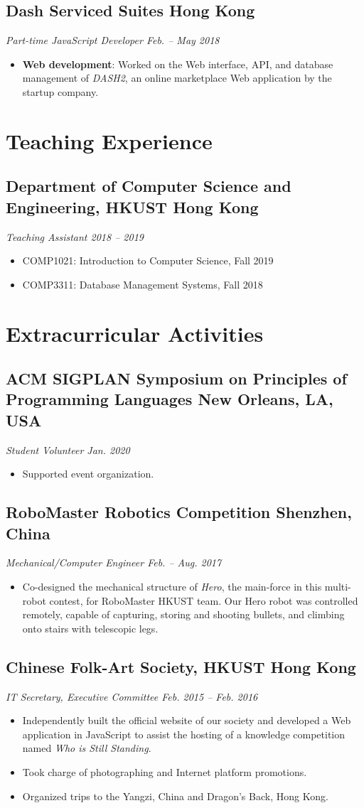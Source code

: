 \documentclass[10pt]{article}
\newcommand{\subsec}[2]{\subsection*{#1 \hfill {\normalfont #2}}}
\newcommand{\subsecdesc}[2]{{\em #1 \hfill #2}}
\begin{document}
  \subsec{Dash Serviced Suites}{Hong Kong}
  \subsecdesc{Part-time JavaScript Developer}{Feb. -- May 2018}
  \begin{itemize}
    \item \textbf{Web development}: Worked on the Web interface, API, and database management of \emph{DASH2}, an online marketplace Web application by the startup company.
  \end{itemize}

\section*{Teaching Experience} %

  \subsec{Department of Computer Science and Engineering, HKUST}{Hong Kong}
  \subsecdesc{Teaching Assistant}{2018 -- 2019}
  \begin{itemize}
    \item COMP1021: Introduction to Computer Science, Fall 2019
    \item COMP3311: Database Management Systems, Fall 2018
  \end{itemize}

\section*{Extracurricular Activities} %

  \subsec{ACM SIGPLAN Symposium on Principles of Programming Languages}{New Orleans, LA, USA}
  \subsecdesc{Student Volunteer}{Jan. 2020}
  \begin{itemize}
    \item Supported event organization.
  \end{itemize}

  \subsec{RoboMaster Robotics Competition}{Shenzhen, China}
  \subsecdesc{Mechanical/Computer Engineer}{Feb. -- Aug. 2017}
  \begin{itemize}
    \item Co-designed the mechanical structure of \emph{Hero}, the main-force in this multi-robot contest, for RoboMaster HKUST team. Our Hero robot was controlled remotely, capable of capturing, storing and shooting bullets, and climbing onto stairs with telescopic legs.
  \end{itemize}

  \subsec{Chinese Folk-Art Society, HKUST}{Hong Kong}
  \subsecdesc{IT Secretary, Executive Committee}{Feb. 2015 -- Feb. 2016}
  \begin{itemize}
    \item Independently built the official website of our society and developed a Web application in JavaScript to assist the hosting of a knowledge competition named \emph{Who is Still Standing}.
    \item Took charge of photographing and Internet platform promotions.
    \item Organized trips to the Yangzi, China and Dragon's Back, Hong Kong.
  \end{itemize}
\end{document}
